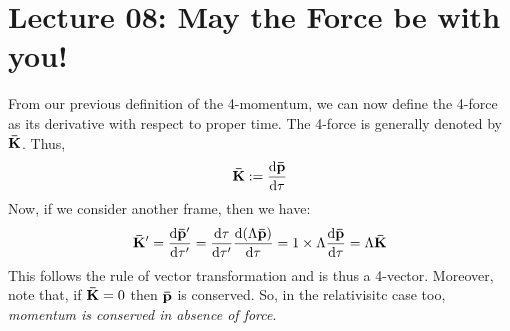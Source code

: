 \section*{Lecture 08: May the Force be with you!}
From our previous definition of the 4-momentum, we can now define the 4-force as its derivative with respect to proper time. The 4-force is generally denoted by $\vb{\bar{K}}$. Thus,
$$ \vb{\bar{K}}:= \dv{\vb{\bar{p}}}{\tau} $$
Now, if we consider another frame, then we have:
$$\vb{\bar{K}}' = \dv{\vb{\bar{p}}'}{\tau'} = \dv{\tau}{\tau'}\dv{\qty(\Lambda \vb{\bar{p}})}{\tau}=1 \times \Lambda \dv{\vb{\bar{p}}}{\tau}=\Lambda \vb{\bar{K}}$$
This follows the rule of vector transformation and is thus a 4-vector. Moreover, note that, if $\vb{\bar{K}} =0$ then $\vb{\bar{p}}$ is conserved. So, in the relativisitc case too, \textit{momentum is conserved in absence of force}. 
